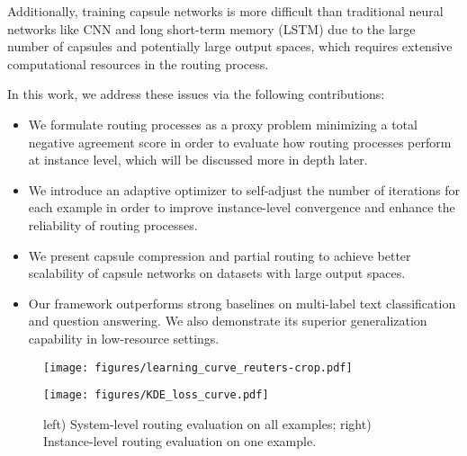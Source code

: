 \documentclass[11pt,a4paper]{article}
\newcommand{\1}{\boldsymbol{1}}
\begin{document}
Additionally, training capsule networks is more difficult than traditional neural networks like CNN and long short-term memory (LSTM) due to the large number of capsules and potentially large output spaces,
which 
requires extensive computational resources in the routing process. 


In this work, we address these issues via the following contributions:
\begin{itemize}[topsep=5pt,itemsep=0pt,leftmargin=*]

\item We formulate routing processes as a proxy problem minimizing a total negative agreement score in order to 
evaluate how routing processes perform 
at instance level, which will be discussed more in depth later.

\item We introduce an adaptive optimizer to self-adjust the number of iterations for each example in order to improve instance-level convergence and enhance the reliability of routing processes.

\item We present capsule compression and partial routing to achieve better scalability of capsule networks on datasets with large output spaces.



\item Our framework outperforms strong baselines on multi-label text classification and question answering. We also demonstrate its superior generalization capability in low-resource settings. 





\end{itemize}

\begin{figure}
\begin{minipage}{0.49\linewidth} 
	\centerline{\texttt{[image: figures/learning\_curve\_reuters-crop.pdf]}} 

\end{minipage} 
\begin{minipage}{0.49\linewidth} 
	\centerline{\texttt{[image: figures/KDE\_loss\_curve.pdf]}}

\end{minipage} 
 \caption{left) System-level routing evaluation on all examples; right) Instance-level routing evaluation on one example. 
}
\label{fig:evaluate-routing}
\vspace{-0.15in}
\end{figure} 
\end{document}
